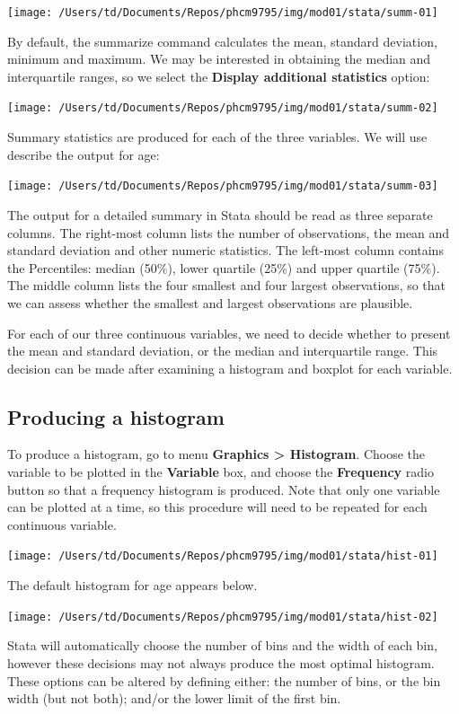 \documentclass[
]{memoir}
\begin{document}
\texttt{[image: /Users/td/Documents/Repos/phcm9795/img/mod01/stata/summ-01]}

By default, the summarize command calculates the mean, standard deviation, minimum and maximum. We may be interested in obtaining the median and interquartile ranges, so we select the \textbf{Display additional statistics} option:

\texttt{[image: /Users/td/Documents/Repos/phcm9795/img/mod01/stata/summ-02]}

Summary statistics are produced for each of the three variables. We will use describe the output for age:

\texttt{[image: /Users/td/Documents/Repos/phcm9795/img/mod01/stata/summ-03]}

The output for a detailed summary in Stata should be read as three separate columns. The right-most column lists the number of observations, the mean and standard deviation and other numeric statistics. The left-most column contains the Percentiles: median (50\%), lower quartile (25\%) and upper quartile (75\%). The middle column lists the four smallest and four largest observations, so that we can assess whether the smallest and largest observations are plausible.

For each of our three continuous variables, we need to decide whether to present the mean and standard deviation, or the median and interquartile range. This decision can be made after examining a histogram and boxplot for each variable.

\hypertarget{producing-a-histogram}{%
\subsection{Producing a histogram}\label{producing-a-histogram}}

To produce a histogram, go to menu \textbf{Graphics \textgreater{} Histogram}. Choose the variable to be plotted in the \textbf{Variable} box, and choose the \textbf{Frequency} radio button so that a frequency histogram is produced. Note that only one variable can be plotted at a time, so this procedure will need to be repeated for each continuous variable.

\texttt{[image: /Users/td/Documents/Repos/phcm9795/img/mod01/stata/hist-01]}

The default histogram for age appears below.

\texttt{[image: /Users/td/Documents/Repos/phcm9795/img/mod01/stata/hist-02]}

Stata will automatically choose the number of bins and the width of each bin, however these decisions may not always produce the most optimal histogram. These options can be altered by defining either: the number of bins, or the bin width (but not both); and/or the lower limit of the first bin.
\end{document}
